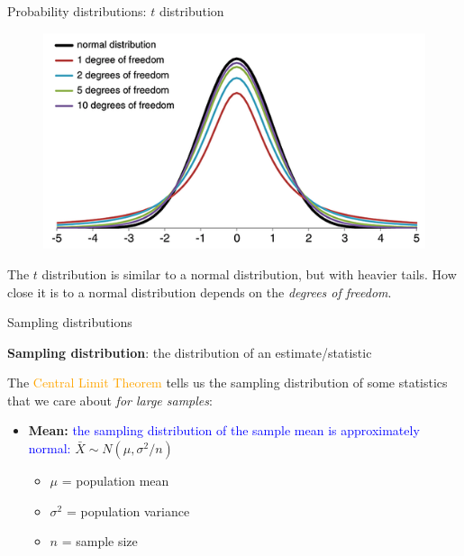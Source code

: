 \documentclass[10pt,t]{beamer}
\begin{document}
\begin{frame}{Probability distributions: $t$ distribution}
\begin{figure}
	\centering \includegraphics[scale=0.5]{tdistn.png}
\end{figure}

The $t$ distribution is similar to a normal distribution, but with heavier tails. How close it is to a normal distribution depends on the \textit{degrees of freedom}.

\end{frame}

\begin{frame}{Sampling distributions}

\textbf{Sampling distribution}: the distribution of an estimate/statistic

\vspace{0.3cm}

The \textcolor{orange}{Central Limit Theorem} tells us the sampling distribution of some statistics that we care about \textit{for large samples}:

\begin{itemize}
	\item \textbf{Mean:} \textcolor{blue}{the sampling distribution of the sample mean is approximately normal:} $\bar{X} \sim N(\mu, \sigma^2 / n)$
	\begin{itemize}
		\item $\mu$ = population mean
		\item $\sigma^2$ = population variance
		\item $n$ = sample size
	\end{itemize}

\end{itemize}
\end{frame}
\end{document}
